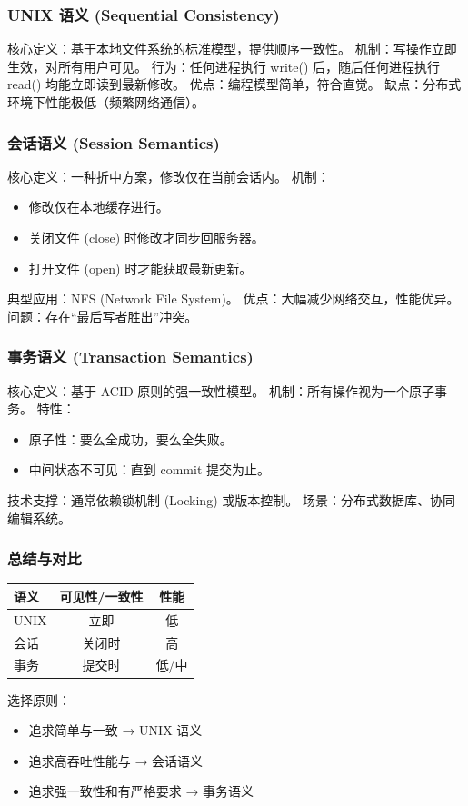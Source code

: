 \subsubsection{UNIX 语义 (Sequential Consistency)}
核心定义：基于本地文件系统的标准模型，提供顺序一致性。
机制：写操作立即生效，对所有用户可见。
行为：任何进程执行 write() 后，随后任何进程执行 read() 均能立即读到最新修改。
优点：编程模型简单，符合直觉。
缺点：分布式环境下性能极低（频繁网络通信）。

\subsubsection{会话语义 (Session Semantics)}
核心定义：一种折中方案，修改仅在当前会话内。
机制：
\begin{itemize}
    \item 修改仅在本地缓存进行。
    \item 关闭文件 (close) 时修改才同步回服务器。
    \item 打开文件 (open) 时才能获取最新更新。
\end{itemize}
典型应用：NFS (Network File System)。
优点：大幅减少网络交互，性能优异。
问题：存在“最后写者胜出”冲突。

\subsubsection{事务语义 (Transaction Semantics)}
核心定义：基于 ACID 原则的强一致性模型。
机制：所有操作视为一个原子事务。
特性：
\begin{itemize}
    \item 原子性：要么全成功，要么全失败。
    \item 中间状态不可见：直到 commit 提交为止。
\end{itemize}
技术支撑：通常依赖锁机制 (Locking) 或版本控制。
场景：分布式数据库、协同编辑系统。

\subsubsection{总结与对比}
\begin{center}
\begin{tabular}{lcc}
\toprule
语义 & 可见性/一致性 & 性能 \\
\midrule
UNIX & 立即 & 低 \\
会话 & 关闭时 & 高 \\
事务 & 提交时 & 低/中 \\
\bottomrule
\end{tabular}
\end{center}
选择原则：
\begin{itemize}
    \item 追求简单与一致 → UNIX 语义
    \item 追求高吞吐性能与 → 会话语义
    \item 追求强一致性和有严格要求 → 事务语义
\end{itemize}

